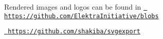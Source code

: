 Rendered images and logos can be found in \href{https://github.com/ElektraInitiative/blobs}{\texttt{ https\+://github.\+com/\+Elektra\+Initiative/blobs}}

\href{https://github.com/shakiba/svgexport}{\texttt{ https\+://github.\+com/shakiba/svgexport}}


\begin{DoxyCode}{0}
\end{DoxyCode}
 